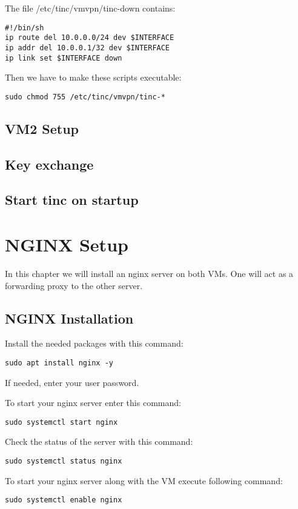 \documentclass[10pt,a4paper]{article}
\begin{document}
The file /etc/tinc/vmvpn/tinc-down contains:
\begin{verbatim}
#!/bin/sh
ip route del 10.0.0.0/24 dev $INTERFACE
ip addr del 10.0.0.1/32 dev $INTERFACE
ip link set $INTERFACE down
\end{verbatim}

Then we have to make these scripts executable:
\begin{verbatim}
sudo chmod 755 /etc/tinc/vmvpn/tinc-*
\end{verbatim}

\subsection{VM2 Setup}

\subsection{Key exchange}

\subsection{Start tinc on startup}

\newpage
\section{NGINX Setup}
In this chapter we will install an nginx server on both VMs. One will act as a forwarding proxy to the other server.

\subsection{NGINX Installation}
Install the needed packages with this command:
\begin{verbatim}
sudo apt install nginx -y
\end{verbatim}

If needed, enter your user password.

To start your nginx server enter this command:
\begin{verbatim}
sudo systemctl start nginx
\end{verbatim}

Check the status of the server with this command:
\begin{verbatim}
sudo systemctl status nginx
\end{verbatim}

To start your nginx server along with the VM execute following command:
\begin{verbatim}
sudo systemctl enable nginx
\end{verbatim}
\end{document}
